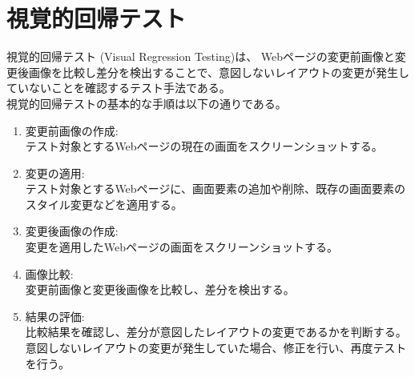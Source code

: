 \section{視覚的回帰テスト}\label{sec:vrt}
視覚的回帰テスト (Visual Regression Testing)\cite{Visual regression testing}は、
Webページの変更前画像と変更後画像を比較し差分を検出することで、意図しないレイアウトの変更が発生していないことを確認するテスト手法である。\\
視覚的回帰テストの基本的な手順は以下の通りである。
\begin{enumerate}
      \setlength{\itemsep}{0pt}
            \setlength{\parsep}{0pt}
      \item 変更前画像の作成:\\
            テスト対象とするWebページの現在の画面をスクリーンショットする。
      \item 変更の適用:\\
            テスト対象とするWebページに、画面要素の追加や削除、既存の画面要素のスタイル変更などを適用する。
      \item 変更後画像の作成:\\
            変更を適用したWebページの画面をスクリーンショットする。
      \item 画像比較:\\
            変更前画像と変更後画像を比較し、差分を検出する。
      \item 結果の評価:\\
            比較結果を確認し、差分が意図したレイアウトの変更であるかを判断する。
            意図しないレイアウトの変更が発生していた場合、修正を行い、再度テストを行う。
\end{enumerate}

